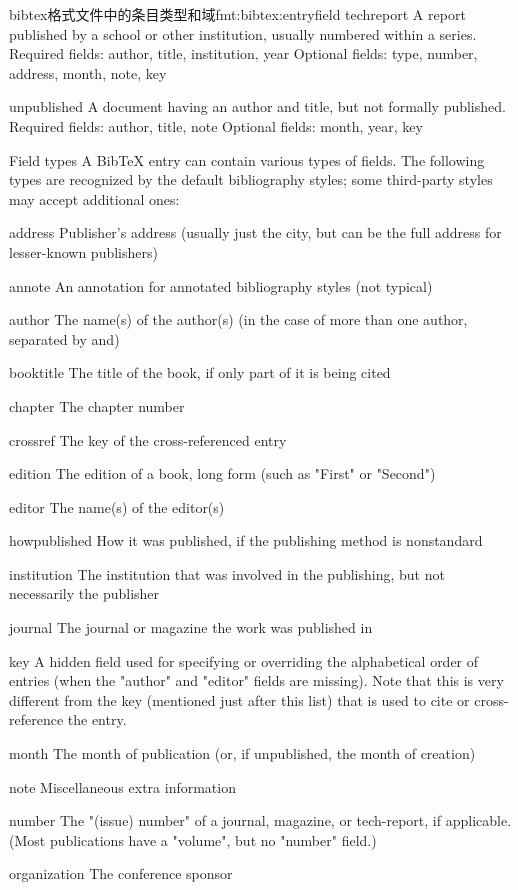 \documentclass[twoside]{article} %
\begin{document}
\begin{codetex}{bibtex格式文件中的条目类型和域}{fmt:bibtex:entryfield}
techreport
A report published by a school or other institution, usually numbered within a series.
Required fields: author, title, institution, year
Optional fields: type, number, address, month, note, key

unpublished
A document having an author and title, but not formally published.
Required fields: author, title, note
Optional fields: month, year, key


Field types
A BibTeX entry can contain various types of fields. The following types are recognized by the default bibliography styles; some third-party styles may accept additional ones:

address
Publisher's address (usually just the city, but can be the full address for lesser-known publishers)

annote
An annotation for annotated bibliography styles (not typical)

author
The name(s) of the author(s) (in the case of more than one author, separated by and)

booktitle
The title of the book, if only part of it is being cited

chapter
The chapter number

crossref
The key of the cross-referenced entry

edition
The edition of a book, long form (such as "First" or "Second")

editor
The name(s) of the editor(s)

howpublished
How it was published, if the publishing method is nonstandard

institution
The institution that was involved in the publishing, but not necessarily the publisher

journal
The journal or magazine the work was published in

key
A hidden field used for specifying or overriding the alphabetical order of entries (when the "author" and "editor" fields are missing). Note that this is very different from the key (mentioned just after this list) that is used to cite or cross-reference the entry.

month
The month of publication (or, if unpublished, the month of creation)

note
Miscellaneous extra information

number
The "(issue) number" of a journal, magazine, or tech-report, if applicable. (Most publications have a "volume", but no "number" field.)

organization
The conference sponsor


\end{codetex}
\end{document}
